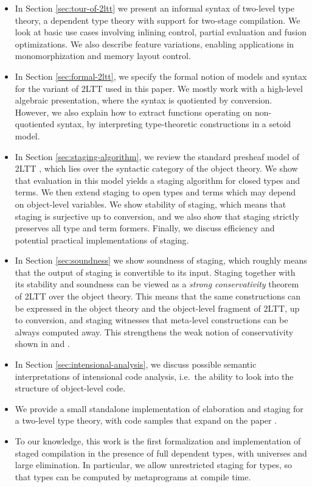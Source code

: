 \documentclass[acmsmall,screen]{acmart}
\theoremstyle{remark}
\begin{document}
\begin{itemize}
  \item In Section \ref{sec:tour-of-2ltt} we present an informal syntax of
    two-level type theory, a dependent type theory with support for two-stage
    compilation. We look at basic use cases involving inlining control, partial
    evaluation and fusion optimizations. We also describe feature variations,
    enabling applications in monomorphization and memory layout control.
  \item In Section \ref{sec:formal-2ltt}, we specify the formal notion of models
    and syntax for the variant of 2LTT used in this paper. We mostly work with a
    high-level algebraic presentation, where the syntax is quotiented by
    conversion. However, we also explain how to extract functions
    operating on non-quotiented syntax, by interpreting type-theoretic
    constructions in a setoid model.
  \item
    In Section \ref{sec:staging-algorithm}, we review the standard presheaf
    model of 2LTT \cite[Section~2.5.3]{twolevel}, which lies over the syntactic
    category of the object theory. We show that evaluation in this model yields
    a staging algorithm for closed types and terms. We then extend staging to
    open types and terms which may depend on object-level variables. We show
    stability of staging, which means that staging is surjective up to
    conversion, and we also show that staging strictly preserves all type and
    term formers. Finally, we discuss efficiency and potential practical implementations
    of staging.
  \item
    In Section \ref{sec:soundness} we show soundness of staging, which roughly
    means that the output of staging is convertible to its input. Staging
    together with its stability and soundness can be viewed as a \emph{strong
    conservativity} theorem of 2LTT over the object theory. This means that the
    same constructions can be expressed in the object theory and the
    object-level fragment of 2LTT, up to conversion, and staging witnesses that
    meta-level constructions can be always computed away. This strengthens the
    weak notion of conservativity shown in \cite{capriotti2017models} and
    \cite{twolevel}.
  \item
    In Section \ref{sec:intensional-analysis}, we discuss possible semantic
    interpretations of intensional code analysis, i.e.\ the ability to look into
    the structure of object-level code.
  \item We provide a small standalone implementation of elaboration and staging
    for a two-level type theory, with code samples that expand on the paper
    \cite{staged-demo}.
  \item To our knowledge, this work is the first formalization and implementation of
    staged compilation in the presence of full dependent types, with
    universes and large elimination. In particular, we allow unrestricted
    staging for types, so that types can be computed by metaprograms at compile
    time.
\end{itemize}
\end{document}
